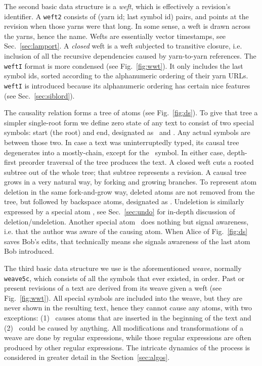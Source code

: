 \documentclass{sig-alternate}
\begin{document}
The second basic data structure is a \emph{weft}, which is effectively a revision's identifier.
A {\tt weft2} consists of (yarn id; last symbol id) pairs, and points at the revision when those yarns were that long. 
In some sense, a weft is drawn across the yarns, hence the name.
Wefts are essentially vector timestamps, see Sec.~\ref{sec:lamport}.
A \emph{closed} weft is a weft subjected to transitive closure, i.e. inclusion of all the recursive dependencies caused by yarn-to-yarn references.
The {\tt weftI} format is more condensed (see Fig.~\ref{fig:wwt}). It only includes the last symbol ids, sorted according to the alphanumeric ordering of their yarn URLs.
{\tt weftI} is introduced because its alphanumeric ordering has certain nice features  (see Sec.~\ref{sec:siblord}).

The causality relation forms a tree of atoms (see Fig.~\ref{fig:ds}).
To give that tree a simpler single-root form we define zero state of any text to consist of two special symbols: start (the root) and end, designated as \aum ~and \eoa.
Any actual symbols are between those two.
In case a text was uninterruptedly typed, its causal tree degenerates into a mostly-chain, except for the \eoa ~symbol.
In either case, depth-first preorder traversal of the tree produces the text.
A closed weft cuts a rooted subtree out of the whole tree; that subtree represents a revision.
A causal tree grows in a very natural way, by forking and growing branches.
To represent atom deletion in the same fork-and-grow way, deleted atoms are not removed from the tree, but followed by backspace atoms, designated as \bsp. 
Undeletion is similarly expressed by a special atom \cnc, see Sec.~\ref{sec:undo} for in-depth discussion of deletion/undeletion.
Another special atom \zero ~does nothing but signal awareness, i.e. that the author was aware of the causing atom. When Alice of Fig.~\ref{fig:ds} saves Bob's edits, that technically means she signals awareness of the last atom Bob introduced.

The third basic data structure we use is the aforementioned \emph{weave}, normally {\tt weave5c}, which consists of all the symbols that ever existed, in order. 
Past or present revisions of a text are derived from its weave given a weft (see Fig.~\ref{fig:wwt}).
All special symbols are included into the weave, but they are never shown in the resulting text, hence they cannot cause any atoms, with two exceptions: (1) \aum ~causes atoms that are inserted in the beginning of the text and (2) \zero ~could be caused by anything.
All modifications and transformations of a weave are done by regular expressions, while those regular expressions are often produced by other regular expressions.
The intricate dynamics of the process is considered in greater detail in the Section~\ref{sec:algos}.
\end{document}
